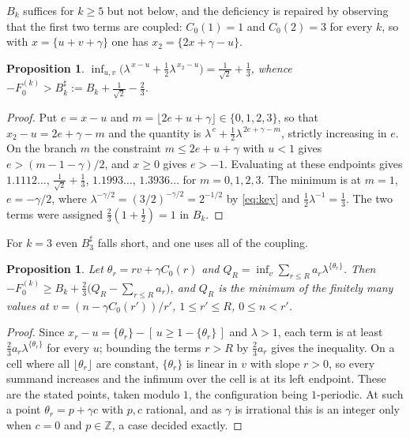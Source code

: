 \documentclass[11pt,a4paper]{article}
\theoremstyle{plain}
\newtheorem{proposition}[theorem]{Proposition}
\theoremstyle{definition}
\newcommand{\Z}{\mathbb{Z}}
\newcommand{\ga}{\gamma}
\newcommand{\fr}[1]{\{#1\}}
\begin{document}
$B_k$ suffices for $k\ge5$ but not below, and the deficiency is repaired by observing that the first
two terms are coupled: $C_0(1)=1$ and $C_0(2)=3$ for every $k$, so with $x=\fr{u+v+\ga}$ one has
$x_2=\fr{2x+\ga-u}$.

\begin{proposition}\label{prop:two}
$\displaystyle\inf_{u,v}\Big(\lambda^{\,x-u}+\tfrac12\lambda^{\,x_2-u}\Big)=\frac1{\sqrt2}+\frac13$,
whence $-F^{(k)}_0>B_k^{\sharp}:=B_k+\tfrac1{\sqrt2}-\tfrac23$.
\end{proposition}

\begin{proof}
Put $e=x-u$ and $m=\lfloor2e+u+\ga\rfloor\in\{0,1,2,3\}$, so that $x_2-u=2e+\ga-m$ and the quantity
is $\lambda^{\,e}+\tfrac12\lambda^{\,2e+\ga-m}$, strictly increasing in $e$. On the branch $m$ the
constraint $m\le2e+u+\ga$ with $u<1$ gives $e>(m-1-\ga)/2$, and $x\ge0$ gives $e>-1$. Evaluating at
these endpoints gives $1.1112\ldots$, $\tfrac1{\sqrt2}+\tfrac13$, $1.1993\ldots$, $1.3936\ldots$ for
$m=0,1,2,3$. The minimum is at $m=1$, $e=-\ga/2$, where $\lambda^{-\ga/2}=(3/2)^{-\ga/2}=2^{-1/2}$
by \eqref{eq:key} and $\tfrac12\lambda^{-1}=\tfrac13$. The two terms were assigned
$\tfrac23(1+\tfrac12)=1$ in $B_k$.
\end{proof}

For $k=3$ even $B_3^{\sharp}$ falls short, and one uses all of the coupling.

\begin{proposition}\label{prop:QR}
Let $\theta_r=rv+\ga C_0(r)$ and $Q_R=\inf_v\sum_{r\le R}a_r\lambda^{\fr{\theta_r}}$. Then
$-F^{(k)}_0\ge B_k+\tfrac23\big(Q_R-\sum_{r\le R}a_r\big)$, and $Q_R$ is the minimum of the finitely
many values at $v=(n-\ga C_0(r'))/r'$, $1\le r'\le R$, $0\le n<r'$.
\end{proposition}

\begin{proof}
Since $x_r-u=\fr{\theta_r}-[\,u\ge1-\fr{\theta_r}\,]$ and $\lambda>1$, each term is at least
$\tfrac23a_r\lambda^{\fr{\theta_r}}$ for every $u$; bounding the terms $r>R$ by $\tfrac23a_r$ gives
the inequality. On a cell where all $\lfloor\theta_r\rfloor$ are constant, $\fr{\theta_r}$ is linear
in $v$ with slope $r>0$, so every summand increases and the infimum over the cell is at its left
endpoint. These are the stated points, taken modulo $1$, the configuration being $1$-periodic. At
such a point $\theta_r=p+\ga c$ with $p,c$ rational, and as $\ga$ is irrational this is an integer
only when $c=0$ and $p\in\Z$, a case decided exactly.
\end{proof}
\end{document}
